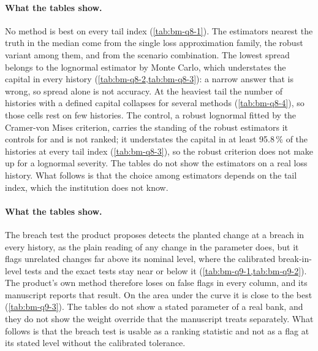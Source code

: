 \paragraph{What the tables show.} No method is best on every tail index (\cref{tab:bm-q8-1}). The estimators nearest the truth in the median come from the single loss approximation family, the robust variant among them, and from the scenario combination. The lowest spread belongs to the lognormal estimator by Monte Carlo, which understates the capital in every history (\cref{tab:bm-q8-2,tab:bm-q8-3}): a narrow answer that is wrong, so spread alone is not accuracy. At the heaviest tail the number of histories with a defined capital collapses for several methods (\cref{tab:bm-q8-4}), so those cells rest on few histories. The control, a robust lognormal fitted by the Cramer-von Mises criterion, carries the standing of the robust estimators it controls for and is not ranked; it understates the capital in at least 95.8\,\% of the histories at every tail index (\cref{tab:bm-q8-3}), so the robust criterion does not make up for a lognormal severity. The tables do not show the estimators on a real loss history. What follows is that the choice among estimators depends on the tail index, which the institution does not know.



\paragraph{What the tables show.} The breach test the product proposes detects the planted change at a breach in every history, as the plain reading of any change in the parameter does, but it flags unrelated changes far above its nominal level, where the calibrated break-in-level tests and the exact tests stay near or below it (\cref{tab:bm-q9-1,tab:bm-q9-2}). The product's own method therefore loses on false flags in every column, and its manuscript reports that result. On the area under the curve it is close to the best (\cref{tab:bm-q9-3}). The tables do not show a stated parameter of a real bank, and they do not show the weight override that the manuscript treats separately. What follows is that the breach test is usable as a ranking statistic and not as a flag at its stated level without the calibrated tolerance.



